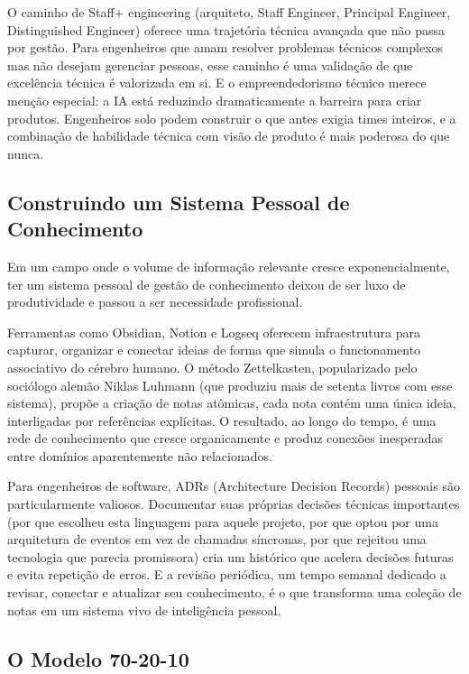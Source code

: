 O caminho de Staff+ engineering (arquiteto, Staff Engineer, Principal Engineer, Distinguished Engineer) oferece uma trajetória técnica avançada que não passa por gestão. Para engenheiros que amam resolver problemas técnicos complexos mas não desejam gerenciar pessoas, esse caminho é uma validação de que excelência técnica é valorizada em si. E o empreendedorismo técnico merece menção especial: a IA está reduzindo dramaticamente a barreira para criar produtos. Engenheiros solo podem construir o que antes exigia times inteiros, e a combinação de habilidade técnica com visão de produto é mais poderosa do que nunca.

\subsection{Construindo um Sistema Pessoal de Conhecimento}

Em um campo onde o volume de informação relevante cresce exponencialmente, ter um sistema pessoal de gestão de conhecimento deixou de ser luxo de produtividade e passou a ser necessidade profissional.

Ferramentas como Obsidian, Notion e Logseq oferecem infraestrutura para capturar, organizar e conectar ideias de forma que simula o funcionamento associativo do cérebro humano. O método Zettelkasten, popularizado pelo sociólogo alemão Niklas Luhmann (que produziu mais de setenta livros com esse sistema), propõe a criação de notas atômicas, cada nota contém uma única ideia, interligadas por referências explícitas. O resultado, ao longo do tempo, é uma rede de conhecimento que cresce organicamente e produz conexões inesperadas entre domínios aparentemente não relacionados.

Para engenheiros de software, ADRs (Architecture Decision Records) pessoais são particularmente valiosos. Documentar suas próprias decisões técnicas importantes (por que escolheu esta linguagem para aquele projeto, por que optou por uma arquitetura de eventos em vez de chamadas síncronas, por que rejeitou uma tecnologia que parecia promissora) cria um histórico que acelera decisões futuras e evita repetição de erros. E a revisão periódica, um tempo semanal dedicado a revisar, conectar e atualizar seu conhecimento, é o que transforma uma coleção de notas em um sistema vivo de inteligência pessoal.

\subsection{O Modelo 70-20-10}

